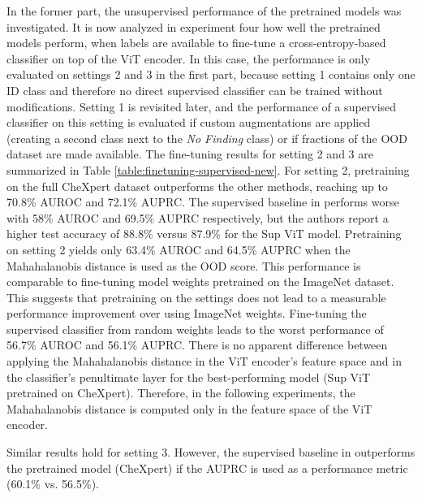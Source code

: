 \par
In the former part, the unsupervised performance of the pretrained models was investigated.
It is now analyzed in experiment four how well the pretrained models perform, when labels are available to fine-tune a cross-entropy-based classifier on top of the ViT encoder.
In this case, the performance is only evaluated on settings 2 and 3 in the first part, because setting 1 contains only one ID class and therefore no direct supervised classifier can be trained without modifications.
Setting 1 is revisited later, and the performance of a supervised classifier on this setting is evaluated if custom augmentations are applied (creating a second class next to the \textit{No Finding} class) or if fractions of the OOD dataset are made available.
The fine-tuning results for setting 2 and 3 are summarized in Table \ref{table:finetuning-supervised-new}.
For setting 2, pretraining on the full CheXpert dataset outperforms the other methods, reaching up to 70.8\% AUROC and 72.1\% AUPRC.
The supervised baseline in \citep{Berger2021} performs worse with 58\% AUROC and 69.5\% AUPRC respectively, but the authors report a higher test accuracy of 88.8\% versus 87.9\% for the Sup ViT model.
Pretraining on setting 2 yields only 63.4\% AUROC and 64.5\% AUPRC when the Mahahalanobis distance is used as the OOD score.
This performance is comparable to fine-tuning model weights pretrained on the ImageNet dataset.
This suggests that pretraining on the settings does not lead to a measurable performance improvement over using ImageNet weights.
Fine-tuning the supervised classifier from random weights leads to the worst performance of 56.7\% AUROC and 56.1\% AUPRC.
There is no apparent difference between applying the Mahahalanobis distance in the ViT encoder's feature space and in the classifier's penultimate layer for the best-performing model (Sup ViT pretrained on CheXpert).
Therefore, in the following experiments, the Mahahalanobis distance is computed only in the feature space of the ViT encoder.
\par
Similar results hold for setting 3. 
However, the supervised baseline in \citep{Berger2021} outperforms the pretrained model (CheXpert) if the AUPRC is used as a performance metric (60.1\% vs. 56.5\%).
